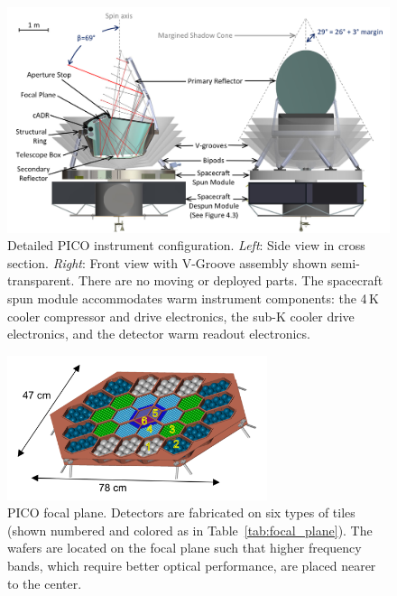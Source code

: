 \begin{figure}
\begin{center}
\includegraphics[width=6.25in]{figures/InstrumentCAD.png}
\caption{\captiontext 
Detailed PICO instrument configuration. \textit{Left}: Side view in cross section. \textit{Right}: Front view with V-Groove assembly shown semi-transparent.  There are no moving or deployed parts. The spacecraft spun module accommodates warm instrument components: the 4\,K cooler compressor and drive electronics, the sub-K cooler drive electronics, and the detector warm readout electronics.\label{fig:InstrumentCAD}}
\end{center}
\end{figure}


\begin{figure}
\parbox{3in}{\centering
\includegraphics[width=3in]{figures/FocalPlaneMechanical.png}
}
\parbox{3.5in}{\centering
\caption{\captiontext 
PICO focal plane. Detectors are fabricated on six types of tiles (shown numbered and colored as in Table~\ref{tab:focal_plane}). The wafers are located on the focal plane such that higher frequency bands, which require better optical performance, are placed nearer to the center.\label{fig:FocalPlaneMechanical}}
}
\end{figure}

